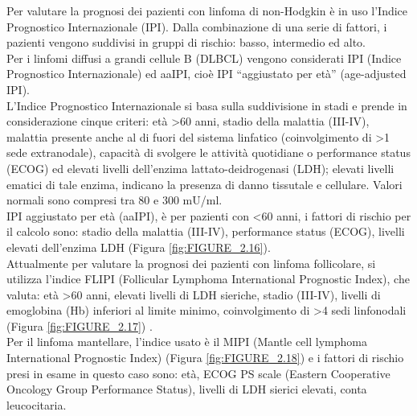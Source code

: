 Per valutare la prognosi dei pazienti con linfoma di non-Hodgkin è in uso l’Indice Prognostico Internazionale (IPI). 
Dalla combinazione di una serie di fattori, i pazienti vengono suddivisi in gruppi di rischio: basso, intermedio 
ed alto\cite{AIOM}.\\ 
Per i linfomi diffusi a grandi cellule B (DLBCL) vengono considerati IPI (Indice Prognostico Internazionale) ed aaIPI, 
cioè IPI “aggiustato per età” (age-adjusted IPI).\\
L’Indice Prognostico Internazionale si basa sulla suddivisione in stadi e prende in considerazione cinque criteri: 
età >60 anni, stadio della malattia (III-IV), malattia presente anche al di fuori del sistema linfatico 
(coinvolgimento di >1 sede extranodale), capacità di svolgere le attività quotidiane o performance status (ECOG)
ed elevati livelli dell’enzima lattato-deidrogenasi (LDH); elevati livelli ematici di tale enzima,
indicano la presenza di danno tissutale e cellulare. Valori normali sono compresi tra 80 e 300 mU/ml\cite{AIOM}.\\ 
IPI aggiustato per età (aaIPI), è per pazienti con <60 anni, i fattori di rischio per il calcolo sono: 
stadio della malattia (III-IV), performance status (ECOG), livelli elevati dell’enzima LDH (Figura \ref{fig:FIGURE_2.16}).\\
Attualmente per valutare la prognosi dei pazienti con linfoma follicolare, si utilizza l’indice FLIPI 
(Follicular Lymphoma International Prognostic Index), che valuta: 
età >60 anni, elevati livelli di LDH sieriche, stadio (III-IV), livelli di emoglobina (Hb) inferiori al limite minimo, 
coinvolgimento di >4 sedi linfonodali (Figura \ref{fig:FIGURE_2.17}) \cite{AIOM}.\\
Per il linfoma mantellare, l’indice usato è il MIPI (Mantle cell lymphoma International Prognostic Index) 
(Figura \ref{fig:FIGURE_2.18}) e i fattori di rischio presi in esame in questo caso sono: età, ECOG PS scale 
(Eastern Cooperative Oncology Group Performance Status), livelli di LDH sierici elevati, conta leucocitaria\cite{MIPI}.

